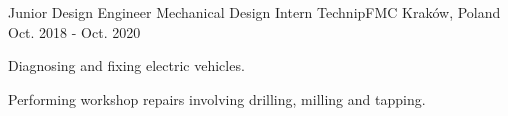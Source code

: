 \begin{cventries}
  \cventry
    {Junior Design Engineer {\enskip\cdotp\enskip} Mechanical Design Intern} %
    {TechnipFMC} %
    {Kraków, Poland} %
    {Oct. 2018 - Oct. 2020} %
    {
      \begin{cvitems} %
      \item{Diagnosing and fixing electric vehicles.}
      \item{Performing workshop repairs involving drilling, milling and tapping.}
      \end{cvitems}
    }
\end{cventries}
